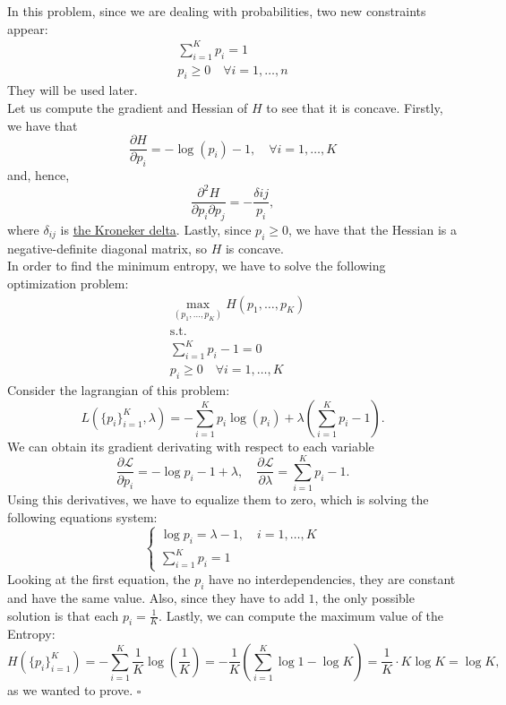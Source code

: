 \documentclass[11pt,table]{article}
\newcommand{\qed}{\hfill $\square$}
\begin{document}
	
	In this problem, since we are dealing with probabilities, two new constraints appear:
	\begin{align*}
		\sum_{i=1}^K p_i = 1 \\
		p_i \geq 0 \quad \forall i =1,\dots,n
	\end{align*}
	They will be used later.\\
	
	Let us compute the gradient and Hessian of \(H\) to see that it is concave. Firstly, we have that
	\[
	\frac{\partial H}{\partial p_i} = - \log(p_i) - 1, \quad \forall i = 1,\dots,K
	\]
	and, hence,
	\[
	\frac{\partial^2 H}{\partial p_i \partial p_j} = - \frac{\delta{ij}}{p_i},
	\]
	where $\delta_{ij}$ is \href{https://en.wikipedia.org/wiki/Kronecker_delta}{the Kroneker delta}. Lastly, since \(p_i \geq 0\), we have that the Hessian is a negative-definite diagonal matrix, so \(H\) is concave.\\
	
	In order to find the minimum entropy, we have to solve the following optimization problem:
	\begin{align*}
		& \max_{(p_1,\dots,p_K)} H(p_1,\dots,p_K) \\
		& \text{s.t.}                             \\
		& \sum_{i=1}^K p_i -1 = 0                 \\
		& p_i \geq 0 \quad \forall i =1,\dots,K
	\end{align*}
	Consider the lagrangian of this problem:
	\[
	L\left(\{p_i\}_{i=1}^K, \lambda\right) = - \sum_{i=1}^K p_i \log(p_i) + \lambda\left(\sum_{i=1}^K p_i -1\right).
	\]
	We can obtain its gradient derivating with respect to each variable
	\[
	\frac{\partial \mathcal L}{\partial p_i} = - \log p_i - 1 + \lambda, \quad \frac{\partial \mathcal L}{\partial \lambda} =  \sum_{i=1}^K p_i -1.
	\]
	Using this derivatives, we have to equalize them to zero, which is solving the following equations system:
	\[
	\begin{cases}
		\log p_i = \lambda - 1, \quad i = 1,\dots,K \\
		\sum_{i=1}^K p_i = 1
	\end{cases}
	\]
	Looking at the first equation, the \(p_i\) have no interdependencies, they are constant and have the same value. Also, since they have to add \(1\), the only possible solution is that each \(p_i = \frac{1}{K}\). Lastly, we can compute the maximum value of the Entropy:
	\[
	H\left(\{p_i\}_{i=1}^K\right) = - \sum_{i=1}^K \frac{1}{K} \log \left(\frac{1}{K}\right)  = - \frac{1}{K} \left(\sum_{i=1}^K \log 1 - \log K\right) = \frac{1}{K} \cdot K \log K = \log K,
	\]
	as we wanted to prove. \qed
	
\end{document}
